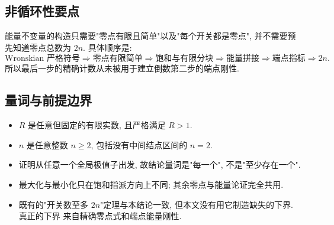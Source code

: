 \documentclass[UTF8]{ctexart}
\begin{document}
\begin{center}
\end{center}

\subsection{非循环性要点}

能量不变量的构造只需要"零点有限且简单"以及"每个开关都是零点", 并不需要预先知道零点总数为
$2n$. 具体顺序是:
\begin{equation*}
	\text{Wronskian 严格符号}\Rightarrow\text{零点有限简单}\Rightarrow
	\text{饱和与有限分块}\Rightarrow\text{能量拼接}\Rightarrow
	\text{端点指标}\Rightarrow 2n .
\end{equation*}
所以最后一步的精确计数从未被用于建立倒数第二步的端点刚性.

\subsection{量词与前提边界}

\begin{itemize}
	\item $R$ 是任意但固定的有限实数, 且严格满足 $R>1$.
	\item $n$ 是任意整数 $n\ge2$, 包括没有中间结点区间的 $n=2$.
	\item 证明从任意一个全局极值子出发, 故结论量词是"每一个", 不是"至少存在一个".
	\item 最大化与最小化只在饱和指派方向上不同; 其余零点与能量论证完全共用.
	\item 既有的"开关数至多 $2n$"定理与本结论一致, 但本文没有用它制造缺失的下界. 真正的下界
		来自精确零点式和端点能量刚性.
\end{itemize}
\end{document}
